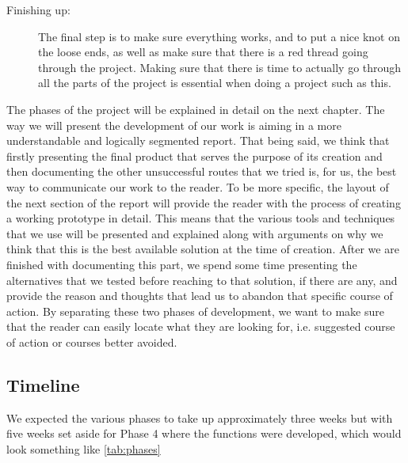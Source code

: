 \begin{description}
  \item[Finishing up:]The final step is to make sure everything works, and to put a nice knot on the loose ends, as well as make sure that there is a red thread going through the project. Making sure that there is time to actually go through all the parts of the project is essential when doing a project such as this. 


\end{description}

The phases of the project will be explained in detail on the next chapter. The way we will present the development of our work is aiming in a more understandable and logically segmented report. That being said, we think that firstly presenting the final product that serves the purpose of its creation and then documenting the other unsuccessful routes that we tried is, for us, the best way to communicate our work to the reader. To be more specific, the layout of the next section of the report will provide the reader with the process of creating a working prototype in detail. This means that the various tools and techniques that we use will be presented and explained along with arguments on why we think that this is the best available solution at the time of creation. After we are finished with documenting this part, we spend some time presenting the alternatives that we tested before reaching to that solution, if there are any, and provide the reason and thoughts that lead us to abandon that specific course of action. By separating these two phases of development, we want to make sure that the reader can easily locate what they are looking for, i.e. suggested course of action or courses better avoided. 

\subsection{Timeline}
We expected the various phases to take up approximately three weeks but with five weeks set aside for Phase 4 where the functions were developed, which would look something like \autoref{tab:phases}\\

